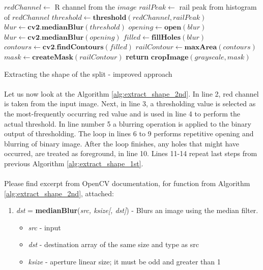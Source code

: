 \begin{algorithm}
	\begin{spacing}{1.5}
	\begin{algorithmic}[1]
			\State $redChannel \gets$ R channel from the $image$
			\State $railPeak \gets$ rail peak from histogram of $redChannel$
			\State $threshold \gets \textbf{threshold}(redChannel, railPeak)$
			\State $blur \gets \textbf{cv2.medianBlur}(threshold)$
				\State $opening \gets \textbf{open}(blur)$
				\State $blur \gets \textbf{cv2.medianBlur}(opening)$
			\EndFor
			\State $filled \gets \textbf{fillHoles}(blur)$
			\State $contours \gets \textbf{cv2.findContours}(filled)$
			\State $railContour \gets \textbf{maxArea}(contours)$
			\State $mask \gets \textbf{createMask}(railContour)$
			\State \textbf{return} $\textbf{cropImage}(grayscale, mask)$
		\EndFunction
	\end{algorithmic}
	\end{spacing}
	\caption{Extracting the shape of the split - improved approach}
	\label{alg:extract_shape_2nd}
\end{algorithm}

\paragraph{}
Let us now look at the Algorithm \ref{alg:extract_shape_2nd}. In line 2, red channel is taken from the input image. Next, in line 3, a thresholding value is selected as the most-frequently occurring red value and is used in line 4 to perform the actual threshold. In line number 5 a blurring operation is applied to the binary output of thresholding. The loop in lines 6 to 9 performs repetitive opening and blurring of binary image. After the loop finishes, any holes that might have occurred, are treated as foreground, in line 10. Lines 11-14 repeat last steps from previous Algorithm \ref{alg:extract_shape_1st}.

\paragraph{}
Please find excerpt from OpenCV documentation, for function from Algorithm \ref{alg:extract_shape_2nd}, attached: \cite{opencv-docs}

\begin{enumerate}
	\item \textit{dst} = \textbf{medianBlur}(\textit{src, ksize[, dst]}) - Blurs an image using the median filter. \small{\begin{itemize}
		\item \textit{src} - input
		\item \textit{dst} - destination array of the same size and type as src
		\item \textit{ksize} - aperture linear size; it must be odd and greater than 1
	\end{itemize}}
\end{enumerate}

